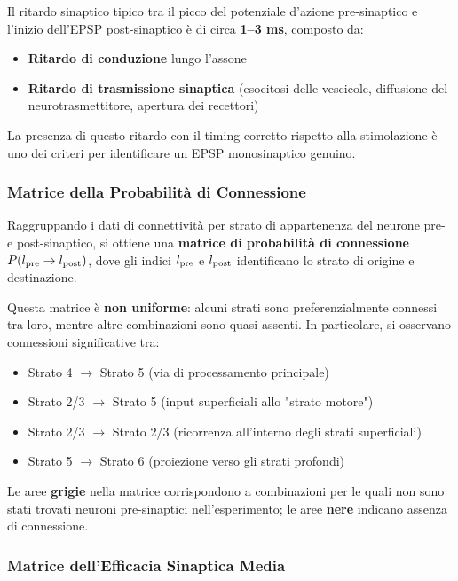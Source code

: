 Il ritardo sinaptico tipico tra il picco del potenziale d'azione pre-sinaptico e l'inizio dell'EPSP post-sinaptico è di circa \textbf{1–3 ms}, composto da:
\begin{itemize}
    \item \textbf{Ritardo di conduzione} lungo l'assone
    \item \textbf{Ritardo di trasmissione sinaptica} (esocitosi delle vescicole, diffusione del neurotrasmettitore, apertura dei recettori)
\end{itemize}

La presenza di questo ritardo con il timing corretto rispetto alla stimolazione è uno dei criteri per identificare un EPSP monosinaptico genuino.



\subsubsection{Matrice della Probabilità di Connessione}

Raggruppando i dati di connettività per strato di appartenenza del neurone pre- e post-sinaptico, si ottiene una \textbf{matrice di probabilità di connessione} $P(l_{\rm pre} \to l_{\rm post})$, dove gli indici $l_{\rm pre}$ e $l_{\rm post}$ identificano lo strato di origine e destinazione.

Questa matrice è \textbf{non uniforme}: alcuni strati sono preferenzialmente connessi tra loro, mentre altre combinazioni sono quasi assenti. In particolare, si osservano connessioni significative tra:

\begin{itemize}
    \item Strato 4 $\to$ Strato 5 (via di processamento principale)
    \item Strato 2/3 $\to$ Strato 5 (input superficiali allo "strato motore")
    \item Strato 2/3 $\to$ Strato 2/3 (ricorrenza all'interno degli strati superficiali)
    \item Strato 5 $\to$ Strato 6 (proiezione verso gli strati profondi)
\end{itemize}

Le aree \textbf{grigie} nella matrice corrispondono a combinazioni per le quali non sono stati trovati neuroni pre-sinaptici nell'esperimento; le aree \textbf{nere} indicano assenza di connessione.

\subsubsection{Matrice dell'Efficacia Sinaptica Media}

